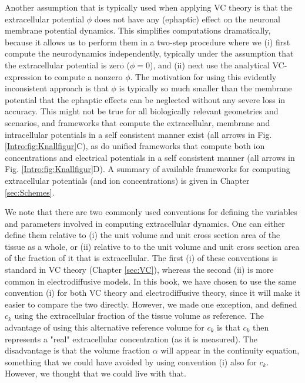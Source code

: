 Another assumption that is typically used when applying VC theory is that the extracellular potential $\phi$ does not have any (ephaptic) effect on the neuronal membrane potential dynamics. This simplifies computations dramatically, because it allows us to perform them in a two-step procedure where we (i) first compute the neurodynamics independently, typically under the assumption that the extracellular potential is zero ($\phi = 0$), and (ii) next use the analytical VC-expression to compute a nonzero $\phi$. The motivation for using this evidently inconsistent approach is that $\phi$ is typically so much smaller than the membrane potential that the ephaptic effects can be neglected without any severe loss in accuracy. This might not be true for all biologically relevant geometries and scenarios, and frameworks that compute the extracellular, membrane and intracellular potentials in a self consistent manner exist (all arrows in Fig. \ref{Intro:fig:Knallfigur}C), as do unified frameworks that compute both ion concentrations and electrical potentials in a self consistent manner (all arrows in Fig. \ref{Intro:fig:Knallfigur}D). A summary of available frameworks for computing extracellular potentials (and ion concentrations) is given in Chapter \ref{sec:Schemes}.

We note that there are two commonly used conventions for defining the variables and parameters involved in computing extracellular dynamics. One can either define them relative to (i) the unit volume and unit cross section area of the tissue as a whole, or (ii) relative to to the unit volume and unit cross section area of the fraction of it that is extracellular. The first (i) of these conventions is standard in VC theory (Chapter \ref{sec:VC}), whereas the second (ii) is more common in electrodiffusive models. In this book, we have chosen to use the same convention (i) for both VC theory and electrodiffusive theory, since it will make it easier to compare the two directly. However, we made one exception, and defined $c_k$ using the extracellular fraction of the tissue volume as reference. The advantage of using this alternative reference volume for $c_k$ is that $c_k$ then represents a "real" extracellular concentration (as it is measured). The disadvantage is that the volume fraction $\alpha$ will appear in the continuity equation, something that we could have avoided by using convention (i) also for $c_k$. However, we thought that we could live with that.












